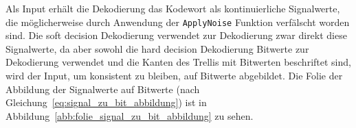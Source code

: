 Als Input erhält die Dekodierung das Kodewort als kontinuierliche Signalwerte, die möglicherweise durch Anwendung der \texttt{ApplyNoise} Funktion verfälscht worden sind. Die soft decision Dekodierung verwendet zur Dekodierung zwar direkt diese Signalwerte, da aber sowohl die hard decision Dekodierung Bitwerte zur Dekodierung verwendet und die Kanten des Trellis mit Bitwerten beschriftet sind, wird der Input, um konsistent zu bleiben, auf Bitwerte abgebildet. Die Folie der Abbildung der Signalwerte auf Bitwerte (nach Gleichung~\ref{eq:signal_zu_bit_abbildung}) ist in Abbildung~\ref{abb:folie_signal_zu_bit_abbildung} zu sehen.
\\
\\
\begin{figure}[th]
	\centering
	\begin{subfigure}{0.48\textwidth}
		\centering
		\caption{}
		\label{abb:folie_dekodierung_1}
	\end{subfigure}
	\quad %
	\begin{subfigure}{0.48\textwidth}
		\centering
		\caption{}
		\label{abb:folie_dekodierung_2}
	\end{subfigure}
	

\end{figure}
